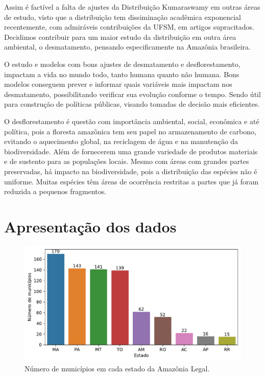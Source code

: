 \documentclass[
]{article}
\begin{document}
Assim é factível a falta de ajustes da Distribuição Kumaraswamy em
outras áreas de estudo, visto que a distribuição tem dissiminação
acadêmica exponencial recentemente, com admiráveis contribuições da
UFSM, em artigos supracitados. Decidimos contribuir para um maior estudo
da distribuição em outra área ambiental, o desmatamento, pensando
especificamente na Amazônia brasileira.

O estudo e modelos com bons ajustes de desmatamento e desflorestamento,
impactam a vida no mundo todo, tanto humana quanto não humana. Bons
modelos conseguem prever e informar quais variáveis mais impactam nos
desmatamento, possibilitando verificar sua evolução conforme o tempo.
Sendo útil para construção de políticas públicas, visando tomadas de
decisão mais eficientes.

O desflorestamento é questão com importância ambiental, social,
econômica e até política, pois a floresta amazônica tem seu papel no
armazenamento de carbono, evitando o aquecimento global, na reciclagem
de água e na manutenção da biodiversidade. Além de fornecerem uma grande
variedade de produtos materiais e de sustento para as populações locais.
Mesmo com áreas com grandes partes preservadas, há impacto na
biodiversidade, pois a distribuição das espécies não é uniforme. Muitas
espécies têm áreas de ocorrência restritas a partes que já foram
reduzida a pequenos fragmentos.

\section{\centering Apresentação dos dados}

\begin{figure}[H]

{\centering \includegraphics{report_files/figure-pdf/fig-num-city-output-1.pdf}

}

\caption{\label{fig-num-city}Número de municípios em cada estado da
Amazônia Legal.}

\end{figure}
\end{document}
